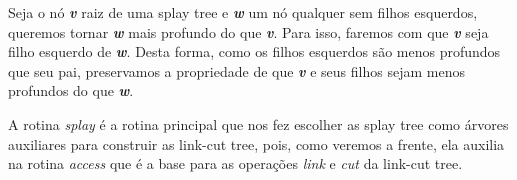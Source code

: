 
Seja o nó \textbf{\textit{v}} raiz de uma splay tree e \textbf{\textit{w}} um nó qualquer sem filhos esquerdos, queremos tornar \textbf{\textit{w}} mais profundo do que \textbf{\textit{v}}. Para isso, faremos com que \textbf{\textit{v}} seja filho esquerdo de \textbf{\textit{w}}. Desta forma, como os filhos esquerdos são menos profundos que seu pai, preservamos a propriedade de que \textbf{\textit{v}} e seus filhos sejam menos profundos do que \textbf{\textit{w}}.  

A rotina \textit{splay} é a rotina principal que nos fez escolher as splay tree como árvores auxiliares para construir as link-cut tree, pois, como veremos a frente, ela auxilia na rotina \textit{access} que é a base para as operações \textit{link} e \textit{cut} da link-cut tree.  
